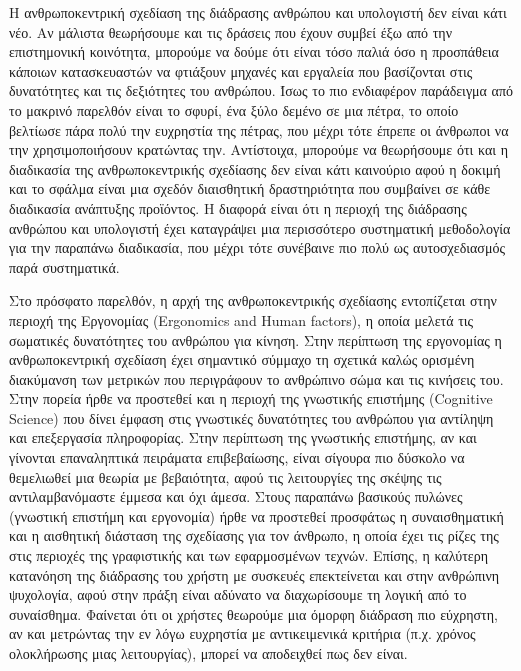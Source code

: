 \documentclass[
]{article}
\begin{document}
Η ανθρωποκεντρική σχεδίαση της διάδρασης ανθρώπου και υπολογιστή δεν
είναι κάτι νέο. Αν μάλιστα θεωρήσουμε και τις δράσεις που έχουν συμβεί
έξω από την επιστημονική κοινότητα, μπορούμε να δούμε ότι είναι τόσο
παλιά όσο η προσπάθεια κάποιων κατασκευαστών να φτιάξουν μηχανές και
εργαλεία που βασίζονται στις δυνατότητες και τις δεξιότητες του
ανθρώπου. Ίσως το πιο ενδιαφέρον παράδειγμα από το μακρινό παρελθόν
είναι το σφυρί, ένα ξύλο δεμένο σε μια πέτρα, το οποίο βελτίωσε πάρα
πολύ την ευχρηστία της πέτρας, που μέχρι τότε έπρεπε οι άνθρωποι να την
χρησιμοποιήσουν κρατώντας την. Αντίστοιχα, μπορούμε να θεωρήσουμε ότι
και η διαδικασία της ανθρωποκεντρικής σχεδίασης δεν είναι κάτι καινούριο
αφού η δοκιμή και το σφάλμα είναι μια σχεδόν διαισθητική δραστηριότητα
που συμβαίνει σε κάθε διαδικασία ανάπτυξης προϊόντος. Η διαφορά είναι
ότι η περιοχή της διάδρασης ανθρώπου και υπολογιστή έχει καταγράψει μια
περισσότερο συστηματική μεθοδολογία για την παραπάνω διαδικασία, που
μέχρι τότε συνέβαινε πιο πολύ ως αυτοσχεδιασμός παρά συστηματικά.

Στο πρόσφατο παρελθόν, η αρχή της ανθρωποκεντρικής σχεδίασης εντοπίζεται
στην περιοχή της Εργονομίας (Ergonomics and Human factors), η οποία
μελετά τις σωματικές δυνατότητες του ανθρώπου για κίνηση. Στην περίπτωση
της εργονομίας η ανθρωποκεντρική σχεδίαση έχει σημαντικό σύμμαχο τη
σχετικά καλώς ορισμένη διακύμανση των μετρικών που περιγράφουν το
ανθρώπινο σώμα και τις κινήσεις του. Στην πορεία ήρθε να προστεθεί και η
περιοχή της γνωστικής επιστήμης (Cognitive Science) που δίνει έμφαση
στις γνωστικές δυνατότητες του ανθρώπου για αντίληψη και επεξεργασία
πληροφορίας. Στην περίπτωση της γνωστικής επιστήμης, αν και γίνονται
επαναληπτικά πειράματα επιβεβαίωσης, είναι σίγουρα πιο δύσκολο να
θεμελιωθεί μια θεωρία με βεβαιότητα, αφού τις λειτουργίες της σκέψης τις
αντιλαμβανόμαστε έμμεσα και όχι άμεσα. Στους παραπάνω βασικούς πυλώνες
(γνωστική επιστήμη και εργονομία) ήρθε να προστεθεί προσφάτως η
συναισθηματική και η αισθητική διάσταση της σχεδίασης για τον άνθρωπο, η
οποία έχει τις ρίζες της στις περιοχές της γραφιστικής και των
εφαρμοσμένων τεχνών. Επίσης, η καλύτερη κατανόηση της διάδρασης του
χρήστη με συσκευές επεκτείνεται και στην ανθρώπινη ψυχολογία, αφού στην
πράξη είναι αδύνατο να διαχωρίσουμε τη λογική από το συναίσθημα.
Φαίνεται ότι οι χρήστες θεωρούμε μια όμορφη διάδραση πιο εύχρηστη, αν
και μετρώντας την εν λόγω ευχρηστία με αντικειμενικά κριτήρια (π.χ.
χρόνος ολοκλήρωσης μιας λειτουργίας), μπορεί να αποδειχθεί πως δεν
είναι.
\end{document}

